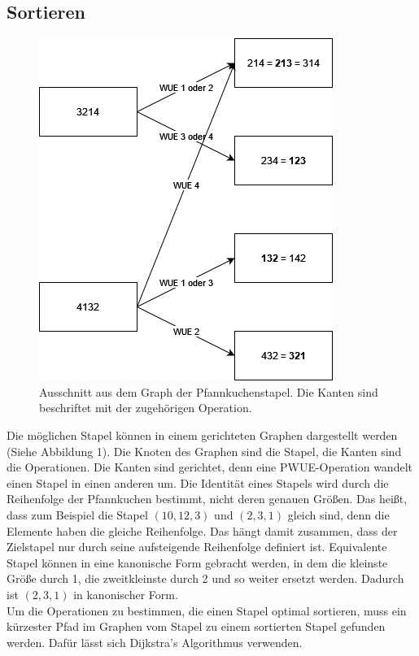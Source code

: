 \documentclass[a4paper,10pt,ngerman]{scrartcl}
\begin{document}
\subsection{Sortieren}
\begin{figure}[t]
  \includegraphics[scale=0.5]{pancakegraph}
  \centering
  \caption{Ausschnitt aus dem Graph der Pfannkuchenstapel. Die Kanten sind beschriftet mit der zugehörigen Operation.}
\end{figure}
Die möglichen Stapel können in einem gerichteten Graphen dargestellt werden (Siehe Abbildung 1). Die Knoten des Graphen
sind die Stapel, die Kanten sind die Operationen. Die Kanten sind gerichtet, denn eine PWUE-Operation
wandelt einen Stapel in einen anderen um. Die Identität eines Stapels wird durch die Reihenfolge der Pfannkuchen bestimmt,
nicht deren genauen Größen. Das heißt, dass zum Beispiel die Stapel $(10,12,3)$ und $(2,3,1)$ gleich sind, denn die Elemente haben die gleiche
Reihenfolge. Das hängt damit zusammen, dass der Zielstapel nur durch seine aufsteigende Reihenfolge definiert ist. Equivalente Stapel können
in eine kanonische Form gebracht werden, in dem die kleinste Größe durch 1, die zweitkleinste durch 2 und so weiter ersetzt werden. Dadurch ist
$(2,3,1)$ in kanonischer Form.
\\
Um die Operationen zu bestimmen, die einen Stapel optimal sortieren, muss
ein kürzester Pfad im Graphen vom Stapel zu einem sortierten Stapel gefunden werden. Dafür lässt sich
Dijkstra's Algorithmus \cite{dijkstra_1959} verwenden.
\end{document}
